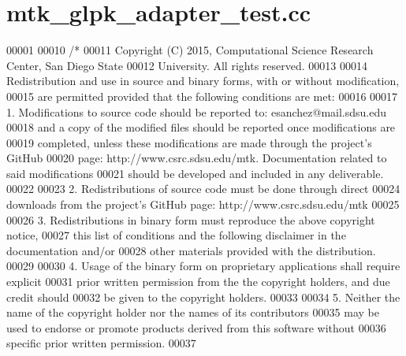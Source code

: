 \hypertarget{mtk__glpk__adapter__test_8cc_source}{\section{mtk\+\_\+glpk\+\_\+adapter\+\_\+test.\+cc}
\label{mtk__glpk__adapter__test_8cc_source}
}

\begin{DoxyCode}
00001 
00010 \textcolor{comment}{/*}
00011 \textcolor{comment}{Copyright (C) 2015, Computational Science Research Center, San Diego State}
00012 \textcolor{comment}{University. All rights reserved.}
00013 \textcolor{comment}{}
00014 \textcolor{comment}{Redistribution and use in source and binary forms, with or without modification,}
00015 \textcolor{comment}{are permitted provided that the following conditions are met:}
00016 \textcolor{comment}{}
00017 \textcolor{comment}{1. Modifications to source code should be reported to: esanchez@mail.sdsu.edu}
00018 \textcolor{comment}{and a copy of the modified files should be reported once modifications are}
00019 \textcolor{comment}{completed, unless these modifications are made through the project's GitHub}
00020 \textcolor{comment}{page: http://www.csrc.sdsu.edu/mtk. Documentation related to said modifications}
00021 \textcolor{comment}{should be developed and included in any deliverable.}
00022 \textcolor{comment}{}
00023 \textcolor{comment}{2. Redistributions of source code must be done through direct}
00024 \textcolor{comment}{downloads from the project's GitHub page: http://www.csrc.sdsu.edu/mtk}
00025 \textcolor{comment}{}
00026 \textcolor{comment}{3. Redistributions in binary form must reproduce the above copyright notice,}
00027 \textcolor{comment}{this list of conditions and the following disclaimer in the documentation and/or}
00028 \textcolor{comment}{other materials provided with the distribution.}
00029 \textcolor{comment}{}
00030 \textcolor{comment}{4. Usage of the binary form on proprietary applications shall require explicit}
00031 \textcolor{comment}{prior written permission from the the copyright holders, and due credit should}
00032 \textcolor{comment}{be given to the copyright holders.}
00033 \textcolor{comment}{}
00034 \textcolor{comment}{5. Neither the name of the copyright holder nor the names of its contributors}
00035 \textcolor{comment}{may be used to endorse or promote products derived from this software without}
00036 \textcolor{comment}{specific prior written permission.}
00037 \textcolor{comment}{}

\end{DoxyCode}
